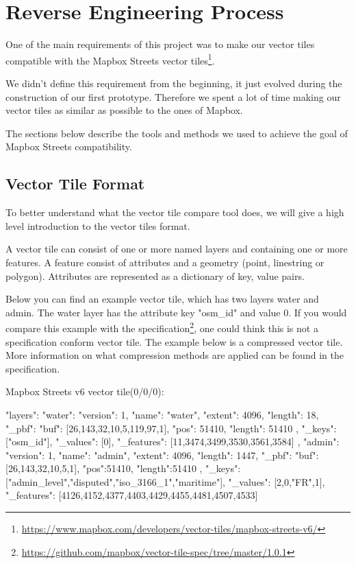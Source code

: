 \section{Reverse Engineering Process}\label{reverse_engineering_process}
One of the main requirements of this project was to make our vector tiles compatible with the Mapbox Streets vector tiles\footnote{\url{https://www.mapbox.com/developers/vector-tiles/mapbox-streets-v6/}}.

We didn't define this requirement from the beginning, it just evolved during the construction of our first prototype.
Therefore we spent a lot of time making our vector tiles as similar as possible to the ones of Mapbox.

The sections below describe the tools and methods we used to achieve the goal of Mapbox Streets compatibility.

\subsection{Vector Tile Format}\label{vector_tile_format}
To better understand what the vector tile compare tool does, we will give a high level introduction to the vector tiles format.

A vector tile can consist of one or more named layers and containing one or more features. A feature consist of attributes and a geometry (point, linestring or polygon). Attributes are represented as a dictionary of key, value pairs. 

Below you can find an example vector tile, which has two layers water and admin. The water layer has the attribute key "osm\_id" and value 0. If you would compare this example with the specification\footnote{\url{https://github.com/mapbox/vector-tile-spec/tree/master/1.0.1}}, one could think this is not a specification conform vector tile. The example below is a compressed vector tile. More information on what compression methods are applied can be found in the specification. 

Mapbox Streets v6 vector tile(0/0/0):
\begin{jsoncode}
{ 
  "layers": {
    "water": {
      "version": 1,
      "name": "water",
      "extent": 4096,
      "length": 18,
      "_pbf": {
        "buf": [26,143,32,10,5,119,97,1],
        "pos": 51410,
        "length": 51410
      },
      "_keys": ["osm_id"],
      "_values": [0],
      "_features": [11,3474,3499,3530,3561,3584] 
    },
    "admin": {
      "version": 1,
      "name": "admin",
      "extent": 4096,
      "length": 1447,
      "_pbf": {
        "buf": [26,143,32,10,5,1],
        "pos":51410,
        "length":51410
       },
      "_keys": ["admin_level","disputed","iso_3166_1","maritime"],
      "_values": [2,0,"FR",1],
      "_features": [4126,4152,4377,4403,4429,4455,4481,4507,4533]
    }
  } 
}
\end{jsoncode}

